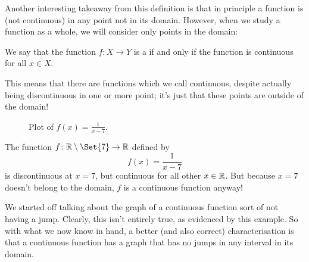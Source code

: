 \noindent
Another interesting takeaway from this definition is that in principle a function is  (not continuous) in any point not in its domain. However, when we study a function as a whole, we will consider only points in the domain:

\begin{definition}
	We say that the function $f \colon X \to Y$ is a  if and only if the function is continuous for all $x \in X$.
\end{definition}

\noindent
This means that there are functions which we call continuous, despite actually being discontinuous in one or more point; it's just that these points are outside of the domain!

\begin{figure}
	\centering
	\caption{Plot of $\displaystyle f(x) = \frac{1}{x - 7}$.}
\end{figure}

\begin{example}
	The function $f \colon \R \setminus \Set{7} \to \R$ defined by
	\[
		f(x) = \frac{1}{x - 7}
	\]
	is discontinuous at $x = 7$, but continuous for all other $x \in \mathbb{R}$. But because $x = 7$ doesn't belong to the domain, $f$ is a continuous function anyway!
\end{example}

\noindent
We started off talking about the graph of a continuous function sort of not having a jump. Clearly, this isn't entirely true, as evidenced by this example. So with what we now know in hand, a better (and also correct) characterisation is that a continuous function has a graph that has no jumps in any interval in its domain.

